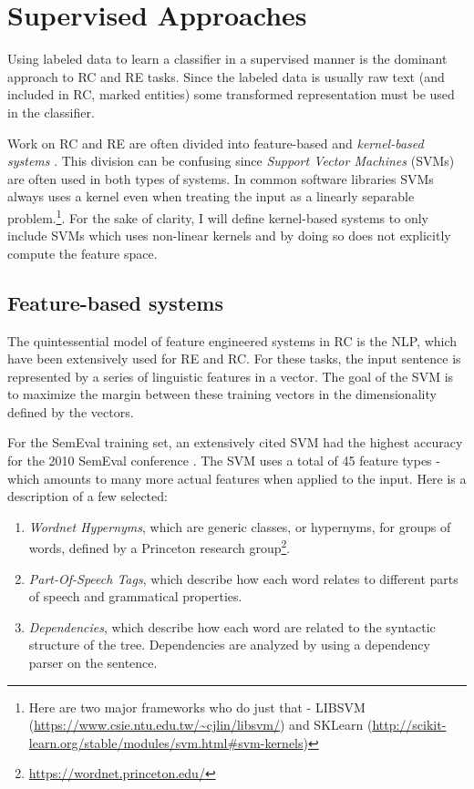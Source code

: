 
\section{Supervised Approaches}

Using labeled data to learn a classifier in a supervised manner is the dominant approach to RC and RE tasks. Since the labeled data is usually raw text (and included in RC, marked entities) some transformed representation must be used in the classifier.    

Work on RC and RE are often divided into feature-based and \emph{kernel-based systems} \citep{re_cnn} \citep{zeng2014}. This division can be confusing since \emph{Support Vector Machines} (SVMs) are often used in both types of systems. In common software libraries SVMs always uses a kernel even when treating the input as a linearly separable problem.\footnote{Here are two major frameworks who do just that - LIBSVM (\url{https://www.csie.ntu.edu.tw/~cjlin/libsvm/}) and SKLearn (\url{http://scikit-learn.org/stable/modules/svm.html\#svm-kernels})}. For the sake of clarity, I will define kernel-based systems to only include SVMs which uses non-linear kernels and by doing so does not explicitly compute the feature space.

\subsection{Feature-based systems}

The quintessential model of feature engineered systems in RC is the NLP, %
which have been extensively used for RE and RC. For these tasks, the input sentence is represented by a series 
of linguistic features in a vector. The goal of the SVM is to maximize the margin between these training vectors in the dimensionality defined by the vectors. 

For the SemEval training set, an extensively cited SVM had the highest accuracy for the 2010 SemEval conference \citep{semevalSVM}. The SVM uses a total of 45 feature types - which amounts to many more actual features when applied to the input. Here is a description of a few selected:

\begin{enumerate}

\item \emph{Wordnet Hypernyms}, which are generic classes, or hypernyms, for groups of words, defined by a Princeton research group\footnote{\url{https://wordnet.princeton.edu/}}.

\item \emph{Part-Of-Speech Tags}, which describe how each word relates to different parts of speech and grammatical properties.

\item \emph{Dependencies}, which describe how each word are related to the syntactic structure of the tree. Dependencies are analyzed by using a dependency parser on the sentence.
\end{enumerate} 

